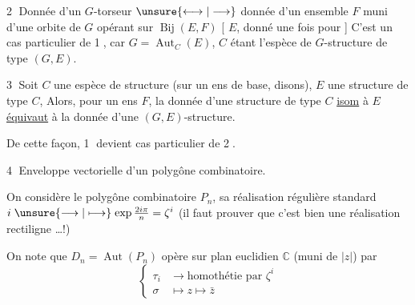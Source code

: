 \textcircled{2} Donnée d'un $G$-torseur  $\unsure{\longleftrightarrow|\longrightarrow}$ donnée d'un ensemble $F$ muni d'une orbite de $G$ opérant sur $\operatorname{Bij}(E,F)$
[ $E$,  donné une fois pour ] C'est un cas particulier de \textcircled{1}, car $G=\operatorname{Aut}_{C}(E)$, $C$ étant l'espèce de $G$-structure de type $(G,E)$.

\textcircled{3} Soit $C$ une espèce de structure (sur un ens de base, disons), $E$ une structure de type $C$,  Alors, pour un ens $F$, la donnée d'une structure de type $C$ \uline{isom} à $E$ \uline{équivaut} à la donnée d'une $(G,E)$-structure.

De cette façon, \textcircled{1} devient cas particulier de \textcircled{2}.

\textcircled{4} Enveloppe vectorielle d'un polygône combinatoire.

On considère le polygône  combinatoire  \deleted{$\unsure{[1,n]|[1,n[}$\unsure{,}} $P_n$, sa réalisation  régulière standard $i\mathrel{\unsure{\longrightarrow|\longmapsto}}\exp\frac{2i\pi}{n}=\zeta^i$ (il faut prouver que c'est bien une réalisation rectiligne \ldots !)

On note que $D_n=\operatorname{Aut}(P_n)$ opère sur   plan euclidien  $\mathbb{C}$ (muni de $|z|$) par 
\[
\left\{\begin{aligned}
\tau_i &\longrightarrow \text{homothétie par }\zeta^i\\
\sigma &\longmapsto z\longmapsto\bar z
\end{aligned}\right.
\]
